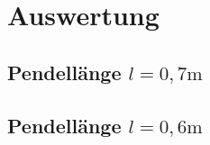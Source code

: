 \section{Auswertung}

\subsection{Pendellänge $l = 0,7 \si{\meter} $}
\begin{minipage}{\textwidth}

 \hfill

\end{minipage}


\begin{minipage}{\textwidth}

 \hfill

\end{minipage}

\begin{minipage}{\textwidth}

 \hfill

\end{minipage}


\subsection{Pendellänge $l = 0,6 \si{\meter} $}
\begin{minipage}{\textwidth}

 \hfill

\end{minipage}


\begin{minipage}{\textwidth}

 \hfill

\end{minipage}

\begin{minipage}{\textwidth}

 \hfill

\end{minipage}
